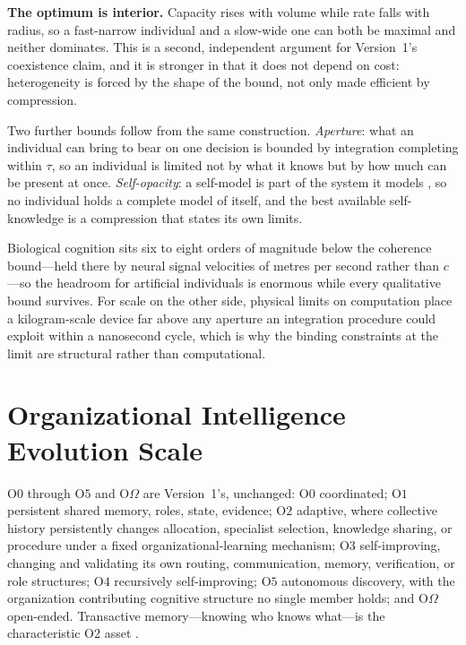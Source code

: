 \documentclass[11pt]{article}
\newcommand{\Olev}[1]{\ensuremath{\mathrm{O}#1}}
\newcommand{\OOm}{\ensuremath{\mathrm{O}\Omega}}
\begin{document}
\textbf{The optimum is interior.} Capacity rises with volume while rate falls with radius, so a fast-narrow individual and a slow-wide one can both be maximal and neither dominates. This is a second, independent argument for Version~1's coexistence claim, and it is stronger in that it does not depend on cost: heterogeneity is forced by the shape of the bound, not only made efficient by compression.

Two further bounds follow from the same construction. \emph{Aperture}: what an individual can bring to bear on one decision is bounded by integration completing within $\tau$, so an individual is limited not by what it knows but by how much can be present at once. \emph{Self-opacity}: a self-model is part of the system it models \citep{conant1970every}, so no individual holds a complete model of itself, and the best available self-knowledge is a compression that states its own limits.

Biological cognition sits six to eight orders of magnitude below the coherence bound---held there by neural signal velocities of metres per second rather than $c$---so the headroom for artificial individuals is enormous while every qualitative bound survives. For scale on the other side, physical limits on computation \citep{lloyd2000ultimate,margolus1998maximum} place a kilogram-scale device far above any aperture an integration procedure could exploit within a nanosecond cycle, which is why the binding constraints at the limit are structural rather than computational.

\section{Organizational Intelligence Evolution Scale}

\Olev{0} through \Olev{5} and \OOm{} are Version~1's, unchanged: \Olev{0} coordinated; \Olev{1} persistent shared memory, roles, state, evidence; \Olev{2} adaptive, where collective history persistently changes allocation, specialist selection, knowledge sharing, or procedure under a fixed organizational-learning mechanism; \Olev{3} self-improving, changing and validating its own routing, communication, memory, verification, or role structures; \Olev{4} recursively self-improving; \Olev{5} autonomous discovery, with the organization contributing cognitive structure no single member holds; and \OOm{} open-ended. Transactive memory---knowing who knows what---is the characteristic \Olev{2} asset \citep{woolley2023understanding}.
\end{document}
